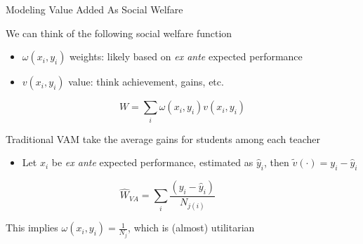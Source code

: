 \documentclass[t,aspectratio=169,11pt]{beamer}
\newenvironment{wideitemize}{\itemize\addtolength{\itemsep}{14pt}}{\enditemize}
\begin{document}
\begin{frame}{Modeling Value Added As Social Welfare}

\begin{wideitemize}
    \item We can think of the following social welfare function
    \begin{itemize}
        \item $\omega(x_i,y_i)$ weights: likely based on \textit{ex ante} expected performance
        \item $v(x_i,y_i)$ value: think achievement, gains, etc.
    \end{itemize}
    \[
    W  = \sum_i \omega(x_i,y_i) v(x_i,y_i) 
    \] 
    
    \item Traditional VAM take the average gains for students among each teacher
    \begin{itemize}
        \item Let $x_i$ be \textit{ex ante} expected performance, estimated as $\hat{y}_i$, then $\tilde{v}(\cdot) = y_i - \hat{y}_i$
    \end{itemize}
    \[
    \hat{W}_{VA}  = \sum_i \frac{(y_i-\hat{y}_i)}{N_{j(i)}} \hspace{3em}
    \]
    
    \item This implies $\omega(x_i,y_i)=\frac{1}{N_j}$, which is (almost) utilitarian
    
    
\end{wideitemize}


\end{frame}
\end{document}
